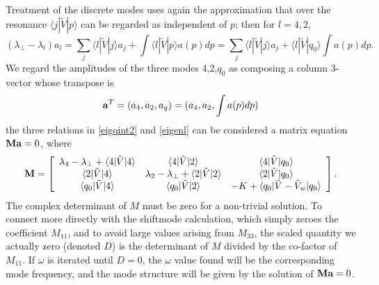 \documentclass[12pt]{article}
\def\ket#1{|#1\rangle}
\def\bra#1{\langle#1}
\def\a{{\bf a}}
\def\M{{\bf M}}
\begin{document}
Treatment of the discrete modes uses again the approximation that
over the resonance $\bra{j}|\tilde V\ket{p}$ can be regarded as
independent of $p$; then for $l=4,2$,
\begin{equation}
  \label{eigenl}
  (\lambda_\perp-\lambda_l)a_l=\sum_j\bra{l}|\tilde{V}\ket{j}a_j
  +\int\bra{l}|\tilde{V}\ket{p}a(p)dp
  =\sum_j\bra{l}|\tilde{V}\ket{j}a_j
  +\bra{l}|\tilde{V}\ket{q_0}\int a(p)dp.
\end{equation}
We regard the amplitudes of the three modes 4,2,$q_0$ as composing a
column 3-vector whose transpose is
\begin{equation}
  \label{avector}
  \a^T=(a_4,a_2,a_q)=(a_4,a_2,\int a(p)dp)
\end{equation}
the three relations in \ref{eigqint2} and \ref{eigenl} can be
considered a matrix equation $\M\a=0$, where
\begin{equation}
  \label{aveq}
  \M=\left[
  \begin{array}{ccc}
    \lambda_4-\lambda_\perp+\bra{4}|\tilde V\ket{4}
    &\bra{4}|\tilde V\ket{2}&\bra{4}|\tilde V\ket{q_0}\\
    \bra{2}|\tilde V\ket{4}
    &\lambda_2-\lambda_\perp+\bra{2}|\tilde
      V\ket{2}&\bra{2}|\tilde V\ket{q_0}\\
    \bra{q_0}|\tilde V\ket{4}
    &\bra{q_0}|\tilde V\ket{2}&-K+\bra{q_0}|\tilde V-\tilde V_w\ket{q_0}
  \end{array}\right]
\iffalse
\left[
  \begin{array}{c}
    a_4\\
    a_2\\
    \int a(p)dp
  \end{array}\right]=0.
\fi.
\end{equation}
The complex determinant of $M$ must be zero for a non-trivial
solution. To connect more directly with the shiftmode calculation,
which simply zeroes the coefficient $M_{11}$, and to avoid large values
arising from $M_{33}$, the scaled quantity we actually zero (denoted $D$)
is the determinant of $M$ divided by the co-factor of $M_{11}$. If
$\omega$ is iterated until $D=0$, the $\omega$ value found will be the
corresponding mode frequency, and the mode structure will be given by
the solution of $\M\a=0$.

\iffalse
Note\footnote{
The ordered perturbative approximations found in prior sections correspond,
in this formulation, to neglecting $\bra{2}|\tilde V\ket{q_0}$,
$\bra{q_0}|\tilde V\ket{2}$ and $\bra{2}|\tilde V\ket{2}$; then
determining $a_2/a_4$ from the second row, and $\int a(p)dp/a_4$ from the third
row.}\fi
\end{document}
